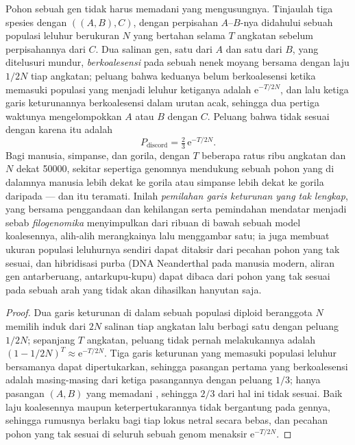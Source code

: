 \begin{proposition}\label{prop:b3:molecular-evolution:ils}
%
Pohon sebuah gen tidak harus memadani  yang mengusungnya.
Tinjaulah tiga spesies dengan  $((A,B),C)$, dengan perpisahan $A$--$B$-nya
didahului sebuah populasi leluhur berukuran $N$ yang bertahan
selama $T$ angkatan sebelum perpisahannya dari $C$. Dua salinan gen, satu dari
$A$ dan satu dari $B$, yang ditelusuri mundur, \emph{berkoalesensi} pada sebuah nenek
moyang bersama dengan laju $1/2N$ tiap angkatan; peluang bahwa keduanya
belum berkoalesensi ketika memasuki populasi yang menjadi leluhur ketiganya
adalah $\mathrm{e}^{-T/2N}$, dan lalu ketiga garis keturunannya berkoalesensi dalam
urutan acak, sehingga dua pertiga waktunya  mengelompokkan $A$ atau $B$
dengan $C$. Peluang bahwa  tidak sesuai dengan  karena itu adalah
\[
P_{\text{discord}} = \tfrac{2}{3}\,\mathrm{e}^{-T/2N} .
\]
Bagi manusia, simpanse, dan gorila, dengan $T$ beberapa ratus
ribu angkatan dan $N$ dekat \num{50000}, sekitar sepertiga
genomnya mendukung sebuah pohon yang di dalamnya manusia lebih dekat ke gorila atau
simpanse lebih dekat ke gorila daripada  --- dan itu teramati. Inilah
\emph{pemilahan garis keturunan yang tak lengkap}, yang bersama penggandaan dan kehilangan
serta pemindahan mendatar menjadi sebab \emph{filogenomika} menyimpulkan  dari ribuan  di bawah sebuah model koalesennya,
alih-alih merangkainya lalu menggambar satu; ia juga membuat ukuran populasi
leluhurnya sendiri dapat ditaksir dari pecahan pohon yang tak
sesuai, dan hibridisasi purba (DNA Neanderthal pada manusia
modern, aliran gen antarberuang, antarkupu-kupu) dapat dibaca dari
pohon yang tak sesuai pada sebuah arah yang tidak akan dihasilkan hanyutan saja.
\end{proposition}
\begin{proof}
Dua garis keturunan di dalam sebuah populasi diploid beranggota $N$ memilih induk dari $2N$
salinan tiap angkatan lalu berbagi satu dengan peluang $1/2N$; sepanjang $T$
angkatan, peluang tidak pernah melakukannya adalah $(1 - 1/2N)^{T} \approx
\mathrm{e}^{-T/2N}$. Tiga garis keturunan yang memasuki populasi leluhur
bersamanya dapat dipertukarkan, sehingga pasangan pertama yang berkoalesensi adalah masing-masing dari
ketiga pasangannya dengan peluang $1/3$; hanya pasangan $(A,B)$ yang memadani
, sehingga $2/3$ dari hal ini tidak sesuai. Baik
laju koalesennya maupun keterpertukarannya tidak bergantung pada gennya, sehingga
rumusnya berlaku bagi tiap lokus netral secara bebas, dan
pecahan pohon yang tak sesuai di seluruh sebuah genom menaksir
$\mathrm{e}^{-T/2N}$.
\end{proof}

